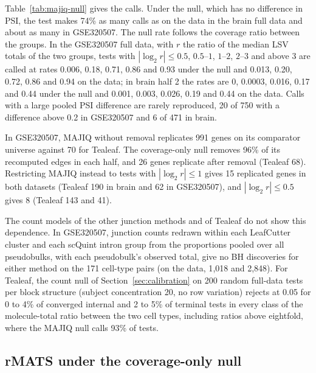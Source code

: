 \documentclass[11pt]{article}
\begin{document}
Table~\ref{tab:majiq-null} gives the calls. Under the null, which has no difference in PSI, the test makes 74\% as many calls as on the data in the brain full data and about as many in GSE320507. The null rate follows the coverage ratio between the groups. In the GSE320507 full data, with $r$ the ratio of the median LSV totals of the two groups, tests with $|\log_2 r|\le0.5$, $0.5$--$1$, $1$--$2$, $2$--$3$ and above 3 are called at rates 0.006, 0.18, 0.71, 0.86 and 0.93 under the null and 0.013, 0.20, 0.72, 0.86 and 0.94 on the data; in brain half 2 the rates are 0, 0.0003, 0.016, 0.17 and 0.44 under the null and 0.001, 0.003, 0.026, 0.19 and 0.44 on the data. Calls with a large pooled PSI difference are rarely reproduced, 20 of 750 with a difference above 0.2 in GSE320507 and 6 of 471 in brain.

In GSE320507, MAJIQ without removal replicates 991 genes on its comparator universe against 70 for Tealeaf. The coverage-only null removes 96\% of its recomputed edges in each half, and 26 genes replicate after removal (Tealeaf 68). Restricting MAJIQ instead to tests with $|\log_2 r|\le1$ gives 15 replicated genes in both datasets (Tealeaf 190 in brain and 62 in GSE320507), and $|\log_2 r|\le0.5$ gives 8 (Tealeaf 143 and 41).

The count models of the other junction methods and of Tealeaf do not show this dependence. In GSE320507, junction counts redrawn within each LeafCutter cluster and each scQuint intron group from the proportions pooled over all pseudobulks, with each pseudobulk's observed total, give no BH discoveries for either method on the 171 cell-type pairs (on the data, 1{,}018 and 2{,}848). For Tealeaf, the count null of Section~\ref{sec:calibration} on 200 random full-data tests per block structure (subject concentration 20, no row variation) rejects at 0.05 for 0 to 4\% of converged internal and 2 to 5\% of terminal tests in every class of the molecule-total ratio between the two cell types, including ratios above eightfold, where the MAJIQ null calls 93\% of tests.

\subsection{rMATS under the coverage-only null}
\end{document}
